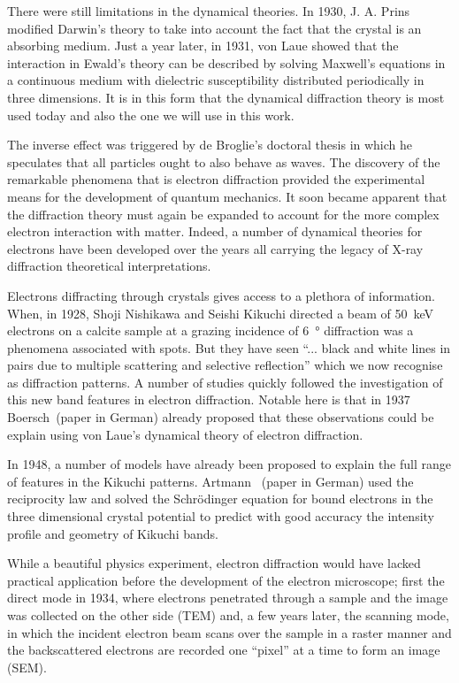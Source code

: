 There were still limitations in the dynamical theories. In 1930, J. A. Prins~\cite{Prins30} modified Darwin's theory to take into account the fact that the crystal is an absorbing medium. Just a year later, in 1931, von Laue showed that the interaction in Ewald's theory can be described by solving Maxwell's equations in a continuous medium with dielectric susceptibility distributed periodically in three dimensions. It is in this form that the dynamical diffraction theory is most used today and also the one we will use in this work.
  
The inverse effect was triggered by de Broglie's doctoral thesis in which he speculates that all particles ought to also behave as waves. The discovery of the remarkable phenomena that is electron diffraction provided the experimental means for the development of quantum mechanics. It soon became apparent that the diffraction theory must again be expanded to account for the more complex electron interaction with matter. Indeed, a number of dynamical theories for electrons have been developed over the years all carrying the legacy of X-ray diffraction theoretical interpretations.   

Electrons diffracting through crystals gives access to a plethora of information. When, in 1928, Shoji Nishikawa and Seishi Kikuchi directed a beam of \SI{50}{\kilo \electronvolt} electrons on a calcite sample at a grazing incidence of \SI{6}{\degree} diffraction was a phenomena associated with spots. But they have seen ``... black and white lines in pairs due to multiple scattering and selective reflection'' which we now recognise as diffraction patterns. A number of studies quickly followed the investigation of this new band features in electron diffraction. Notable here is that in 1937 Boersch~\cite{Boersch37}(paper in German) already proposed that these observations could be explain using von Laue's dynamical theory of electron diffraction.


In 1948, a number of models have already been proposed to explain the full range of features in the Kikuchi patterns. Artmann~\cite{Artmann48} (paper in German) used the reciprocity law and solved the Schr{\"o}dinger equation for bound electrons in the three dimensional crystal potential to predict with good accuracy the intensity profile and geometry of Kikuchi bands. 

While a beautiful physics experiment, electron diffraction would have lacked practical application before the development of the electron microscope; first the direct mode in 1934, where electrons penetrated through a sample and the image was collected on the other side (TEM) and, a few years later, the scanning mode, in which the incident electron beam scans over the sample in a raster manner and the backscattered electrons are recorded one ``pixel'' at a time to form an image (SEM). 

